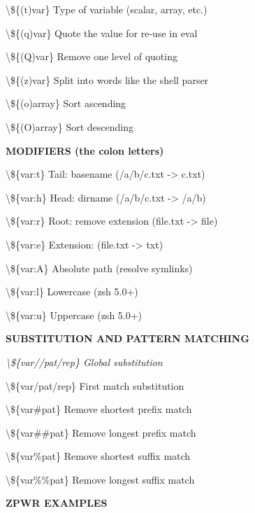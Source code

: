 \documentclass[11pt,a4paper,twoside]{book}
\begin{document}
\textbackslash{}\$\{(t)var\}            Type of variable (scalar, array, etc.)

\textbackslash{}\$\{(q)var\}            Quote the value for re-use in eval

\textbackslash{}\$\{(Q)var\}            Remove one level of quoting

\textbackslash{}\$\{(z)var\}            Split into words like the shell parser

\textbackslash{}\$\{(o)array\}          Sort ascending

\textbackslash{}\$\{(O)array\}          Sort descending


\vspace{12pt}
{\bfseries\color{neonyellow} MODIFIERS (the colon letters)}\vspace{4pt}

\textbackslash{}\$\{var:t\}             Tail: basename (/a/b/c.txt -> c.txt)

\textbackslash{}\$\{var:h\}             Head: dirname (/a/b/c.txt -> /a/b)

\textbackslash{}\$\{var:r\}             Root: remove extension (file.txt -> file)

\textbackslash{}\$\{var:e\}             Extension: (file.txt -> txt)

\textbackslash{}\$\{var:A\}             Absolute path (resolve symlinks)

\textbackslash{}\$\{var:l\}             Lowercase (zsh 5.0+)

\textbackslash{}\$\{var:u\}             Uppercase (zsh 5.0+)


\vspace{12pt}
{\bfseries\color{neonyellow} SUBSTITUTION AND PATTERN MATCHING}\vspace{4pt}

{\small\itshape\color{dimtext} \textbackslash{}\$\{var//pat/rep\}       Global substitution}

\textbackslash{}\$\{var/pat/rep\}        First match substitution

\textbackslash{}\$\{var\#pat\}            Remove shortest prefix match

\textbackslash{}\$\{var\#\#pat\}           Remove longest prefix match

\textbackslash{}\$\{var\%pat\}            Remove shortest suffix match

\textbackslash{}\$\{var\%\%pat\}           Remove longest suffix match


\vspace{12pt}
{\bfseries\color{neonyellow} ZPWR EXAMPLES}\vspace{4pt}
\end{document}
